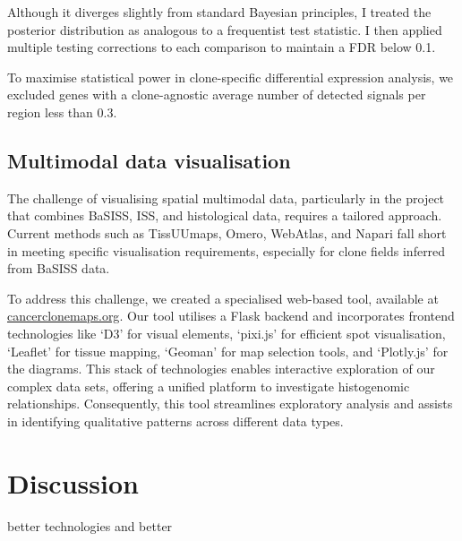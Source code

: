 Although it diverges slightly from standard Bayesian principles, I treated the posterior distribution as analogous to a frequentist test statistic. I then applied multiple testing corrections to each comparison to maintain a \acf{FDR} below 0.1.

To maximise statistical power in clone-specific differential expression analysis, we excluded genes with a clone-agnostic average number of detected signals per region less than 0.3.

\subsection{Multimodal data visualisation}

The challenge of visualising spatial multimodal data, particularly in the project that combines \ac{BaSISS}, \ac{ISS}, and histological data, requires a tailored approach. Current methods such as \ac{TissUUmaps}, \ac{Omero}, \ac{WebAtlas}, and \ac{Napari} fall short in meeting specific visualisation requirements, especially for clone fields inferred from \ac{BaSISS} data.

To address this challenge, we created a specialised web-based tool, available at \href{https://www.cancerclonemaps.org/}{cancerclonemaps.org}. Our tool utilises a Flask backend and incorporates frontend technologies like `D3' for visual elements, `pixi.js' for efficient spot visualisation, `Leaflet' for tissue mapping, `Geoman' for map selection tools, and `Plotly.js' for the diagrams. This stack of technologies enables interactive exploration of our complex data sets, offering a unified platform to investigate histogenomic relationships. Consequently, this tool streamlines exploratory analysis and assists in identifying qualitative patterns across different data types.

\section{Discussion}

better technologies and better 